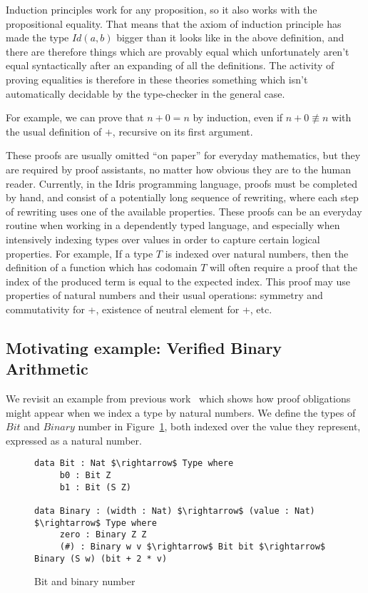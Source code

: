 Induction principles work for any proposition, so it also works with the
propositional equality. That means that the axiom of induction principle has
made the type $Id(a,b)$ bigger than it looks like in the above definition, and
there are therefore things which are provably equal which unfortunately aren't
equal syntactically after an expanding of all the definitions. The activity of
proving equalities is therefore in these theories something which isn't
automatically decidable by the type-checker in the general case.

For example, we can prove that $n+0 = n$ by induction, even if $n+0 \not\equiv
n$ with the usual definition of $+$, recursive on its first argument. 

These proofs are usually omitted ``on paper'' for everyday mathematics, but
they are required by proof assistants, no matter how obvious they are to the
human reader.
Currently, in the Idris programming language, proofs must be completed
by hand, and consist
of a potentially long sequence of rewriting, where each step of
rewriting uses one of the available properties. These proofs can be
an everyday
routine when working in a dependently typed language, and especially
when intensively indexing types over values in order to capture certain logical
properties.  For example, If a type $T$ is indexed over natural numbers, then
the definition of a function which has codomain $T$ will often require a
proof that the index of the produced term is equal to the expected index. This
proof may use properties of natural numbers and their usual operations:
symmetry and commutativity for +, existence of neutral element for +, etc.

\subsection{Motivating example: Verified Binary Arithmetic}
\label{sect:motivatingExample}

We revisit an example from previous work~\cite{bradytfp07} 
which shows how proof obligations might appear
when we index a type by natural numbers.  We define the types of
$Bit$ and $Binary$ number in Figure~\ref{binarynums}, 
both indexed over the value they represent, expressed as a natural number.

\begin{figure}[H]
\figrule
\begin{center}
\begin{lstlisting}
data Bit : Nat $\rightarrow$ Type where
     b0 : Bit Z
     b1 : Bit (S Z)
     
data Binary : (width : Nat) $\rightarrow$ (value : Nat) $\rightarrow$ Type where
     zero : Binary Z Z
     (#) : Binary w v $\rightarrow$ Bit bit $\rightarrow$ Binary (S w) (bit + 2 * v)
\end{lstlisting}
\end{center}
\caption{Bit and binary number}
\label{binarynums}
\figrule
\end{figure}

